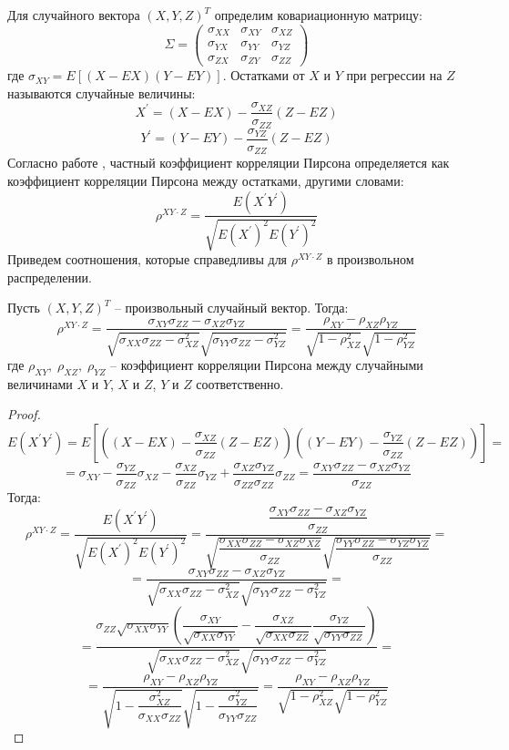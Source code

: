 Для случайного вектора $(X,Y,Z)^T$ определим ковариационную матрицу:
$$\Sigma =
    \begin{pmatrix}
        \sigma_{XX} & \sigma_{XY} & \sigma_{XZ} \\
        \sigma_{YX} & \sigma_{YY} & \sigma_{YZ} \\
        \sigma_{ZX} & \sigma_{ZY} & \sigma_{ZZ}
    \end{pmatrix}
$$
где $\sigma_{XY}=E[(X-EX)(Y-EY)]$.
Остатками от $X$ и $Y$ при регрессии на $Z$ называются случайные величины:
$$
X^{\prime}=(X-EX)-\dfrac{\sigma_{XZ}}{\sigma_{ZZ}}(Z-EZ)
$$
$$
Y^{\prime}=(Y-EY)-\dfrac{\sigma_{YZ}}{\sigma_{ZZ}}(Z-EZ)
$$
Согласно работе \cite{Cramér1946}, частный коэффициент корреляции Пирсона определяется как коэффициент
корреляции Пирсона между остатками, другими словами:
$$
\rho^{XY \cdot Z}=\dfrac{E(X^{\prime} Y^{\prime})}{\sqrt{E(X^{\prime})^2 E(Y^{\prime})^2}}
$$
Приведем соотношения, которые справедливы
для $\rho^{XY \cdot Z}$ в произвольном распределении.
\begin{lemma}
    Пусть $(X,Y,Z)^T$ -- произвольный случайный вектор. Тогда:
    $$
    \rho^{XY \cdot Z}=\dfrac{\sigma_{XY} \sigma_{ZZ} - \sigma_{XZ} \sigma_{YZ}}{\sqrt{\sigma_{XX}\sigma_{ZZ}-
        \sigma_{XZ}^2}\sqrt{\sigma_{YY}\sigma_{ZZ}-\sigma_{YZ}^2}}=\dfrac{\rho_{XY}-\rho_{XZ}\rho_{YZ}}{\sqrt{1-\rho_{XZ}^2}\sqrt{1-\rho_{YZ}^2}}
    $$
    где $\rho_{XY}, \; \rho_{XZ}, \; \rho_{YZ}$ -- коэффициент корреляции Пирсона
        между случайными величинами $X$ и $Y$, $X$ и $Z$, $Y$ и $Z$
        соответственно.
\end{lemma}
\begin{proof}
    $$E(X^\prime Y^\prime)=E[((X-EX)-\dfrac{\sigma_{XZ}}{\sigma_{ZZ}}(Z-EZ))((Y-EY)-\dfrac{\sigma_{YZ}}{\sigma_{ZZ}}(Z-EZ))]=$$
    $$=\sigma_{XY}-\dfrac{\sigma_{YZ}}{\sigma_{ZZ}}\sigma_{XZ}-\dfrac{\sigma_{XZ}}{\sigma_{ZZ}}\sigma_{YZ}+
    \dfrac{\sigma_{XZ}\sigma_{YZ}}{\sigma_{ZZ}\sigma_{ZZ}}\sigma_{ZZ}=\dfrac{\sigma_{XY}\sigma_{ZZ}-\sigma_{XZ}\sigma_{YZ}}{\sigma_{ZZ}}$$
    Тогда:
    $$
    \rho^{XY \cdot Z}=\dfrac{E(X^{\prime} Y^{\prime})}{\sqrt{E(X^{\prime})^2 E(Y^{\prime})^2}}=\dfrac{\dfrac{\sigma_{XY}\sigma_{ZZ}-\sigma_{XZ}\sigma_{YZ}}{\sigma_{ZZ}}}
    {\sqrt{
        \dfrac{\sigma_{XX}\sigma_{ZZ}-\sigma_{XZ}\sigma_{XZ}}{\sigma_{ZZ}}
    }\sqrt{
        \dfrac{\sigma_{YY}\sigma_{ZZ}-\sigma_{YZ}\sigma_{YZ}}{\sigma_{ZZ}}
    }}=
    $$
    $$
    =\dfrac{\sigma_{XY} \sigma_{ZZ} - \sigma_{XZ} \sigma_{YZ}}{\sqrt{\sigma_{XX}\sigma_{ZZ}-
    \sigma_{XZ}^2}\sqrt{\sigma_{YY}\sigma_{ZZ}-\sigma_{YZ}^2}}=
    $$
    $$
    =\dfrac{\sigma_{ZZ}\sqrt{\sigma_{XX}\sigma_{YY}}
    \left(\dfrac{\sigma_{XY}}{\sqrt{\sigma_{XX}\sigma_{YY}}} 
    - \dfrac{\sigma_{XZ}}{\sqrt{\sigma_{XX}\sigma_{ZZ}}} \dfrac{\sigma_{YZ}}{\sqrt{\sigma_{YY}\sigma_{ZZ}}}\right)}
    {\sqrt{\sigma_{XX}\sigma_{ZZ}-
    \sigma_{XZ}^2}\sqrt{\sigma_{YY}\sigma_{ZZ}-\sigma_{YZ}^2}}=
    $$
    $$
    =\dfrac{\rho_{XY}-\rho_{XZ}\rho_{YZ}}{\sqrt{1-\dfrac{\sigma_{XZ}^2}{\sigma_{XX}\sigma_{ZZ}}}
    \sqrt{1-\dfrac{\sigma_{YZ}^2}{\sigma_{YY}\sigma_{ZZ}}}}
    =\dfrac{\rho_{XY}-\rho_{XZ}\rho_{YZ}}{\sqrt{1-\rho_{XZ}^2}\sqrt{1-\rho_{YZ}^2}}
    $$
\end{proof}

